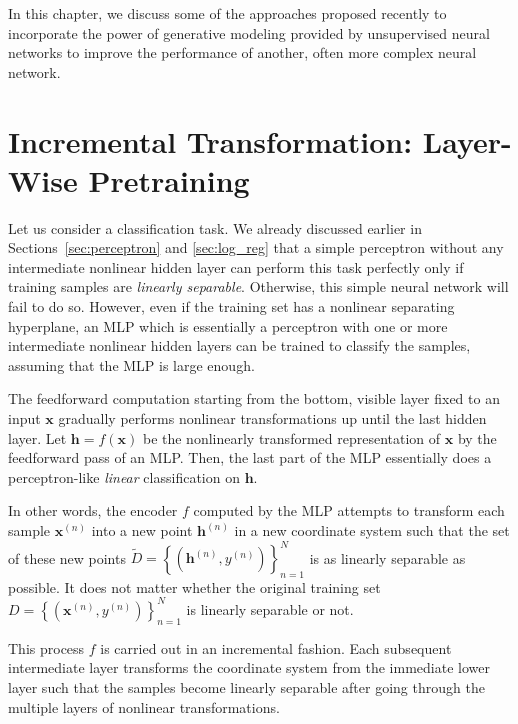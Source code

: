\documentclass{now}
\newcommand{\vect}[1]{\mathbf{#1}}
\newcommand{\vh}[0]{\vect{h}}
\newcommand{\vx}[0]{\vect{x}}
\begin{document}
In this chapter, we discuss some of the approaches proposed
recently to incorporate the power of generative modeling
provided by unsupervised neural networks to improve the
performance of another, often more complex neural network.  


\section{Incremental Transformation: Layer-Wise Pretraining}
\label{sec:layer_wise_pretraining}

Let us consider a classification task. We already
discussed earlier in Sections~\ref{sec:perceptron} and
\ref{sec:log_reg} that a simple perceptron without any
intermediate nonlinear hidden layer can perform this task
perfectly only if training samples are \textit{linearly
separable}. Otherwise, this simple neural network will fail to
do so.  However, even
if the training set has a nonlinear separating hyperplane,
an MLP which is essentially a perceptron with one or more
intermediate nonlinear hidden layers can be trained to
classify the samples, assuming that the MLP is large enough.

The feedforward computation starting from the bottom,
visible layer fixed to an input $\vx$ gradually performs
nonlinear transformations up until the last hidden layer.
Let $\vh=f(\vx)$ be the nonlinearly transformed
representation of $\vx$ by the feedforward pass of an MLP.
Then, the last part of the MLP essentially does a
perceptron-like \textit{linear} classification on $\vh$.

In other words, the encoder $f$ computed by the MLP attempts to
transform each sample $\vx^{(n)}$ into a new point
$\vh^{(n)}$ in a new coordinate system such that the set of
these new points $\tilde{D} = \left\{ (\vh^{(n)}, y^{(n)})
\right\}_{n=1}^N$ is as linearly separable as possible. It
does not matter whether the original training set $D=\left\{
(\vx^{(n)},y^{(n)}) \right\}_{n=1}^N$ is linearly
separable or not.

This process $f$ is carried out in an incremental fashion.
Each subsequent intermediate layer transforms the coordinate
system from the immediate lower layer such that the samples
become linearly separable after going through the multiple
layers of nonlinear transformations.
%

\end{document}
